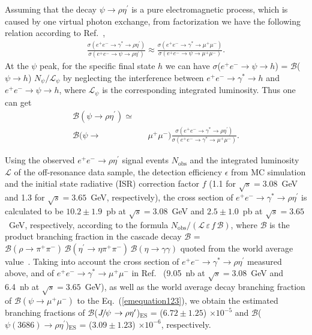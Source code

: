 \documentclass[twocolumn,showpacs,aps,prd]{revtex4-1}
\newcommand{\etap}{\eta^{\prime}}
\newcommand{\psip}{\psi(3686)}
\begin{document}
Assuming that the decay $\psi\to \rho\eta^\prime$ is a pure electromagnetic process, which is caused by one virtual photon
exchange, from factorization we have the following relation according to Ref.~\cite{daijp12},
%
\begin{eqnarray}
  \label{emequation}
  \frac{\sigma(e^+e^-\to \gamma^*\to \rho\eta^\prime)}{\sigma(e^+e^-\to \psi\to \rho\eta^\prime)}\approx
  \frac{\sigma(e^+e^-\to \gamma^*\to \mu^+\mu^-)}{\sigma(e^+e^-\to \psi\to \mu^+\mu^-)}.
\end{eqnarray}
%
    At the $\psi$ peak, for the specific final state $h$ we can have $\sigma$($e^{+}e^{-} \to \psi \to h$) = $\mathcal{B}$($\psi\to h$) $N_{\psi} /\mathcal{L_{\psi}}$ by neglecting the interference between $e^{+}e^{-} \to \gamma^{*} \to h$ and $e^{+}e^{-} \to \psi \to h$,
where $\mathcal{L}_{\psi}$ is the corresponding integrated luminosity.  Thus one can get
\begin{eqnarray}
  \label{emequation123}
   \mathcal{B}(\psi\to \rho\eta^\prime) \simeq && \nonumber \\
     \mathcal{B}(\psi\to &&\mu^+\mu^-)  \frac{\sigma(e^+e^-\to \gamma^*\to \rho\eta^\prime)}{\sigma(e^+e^-\to \gamma^*\to \mu^+\mu^-)} .
\end{eqnarray}


Using the observed $e^{+}e^{-}\to \rho \etap$ signal events $N_\text{obs}$ and the integrated luminosity $\mathcal{L}$ of the off-resonance data sample, the detection efficiency $\epsilon$ from MC simulation and the initial state radiative (ISR) correction factor $f$ (1.1 for $\sqrt{s} = 3.08$~GeV and 1.3 for $\sqrt{s} = 3.65$~GeV, respectively), the cross section of $e^{+}e^{-}\to \gamma^{*} \to \rho \etap$ is calculated to be $10.2\pm 1.9$~pb at $\sqrt{s}= 3.08$~GeV and $2.5\pm 1.0$~pb at $\sqrt{s} = 3.65$~GeV, respectively, according to the formula $N_\text{obs}/(\mathcal{L}\, \varepsilon\,  f\, \mathcal{B})$, where $\mathcal{B}$ is the product branching fraction in the cascade decay $\mathcal{B}$ = $\mathcal{B}(\rho\to \pi^+\pi^-)\, \mathcal{B}(\eta^\prime\to \eta\pi^+\pi^-)\, \mathcal{B}(\eta\to \gamma\gamma)$ quoted from the world average value~\cite{pdg}. Taking into account the cross section of $e^{+}e^{-}\to \gamma^{*} \to \rho \etap$ measured above, and of $e^{+}e^{-}\to \gamma^{*} \to \mu^{+}\mu^{-}$ in Ref.~\cite{crosssectioneetomumu} (9.05~nb at $\sqrt s = 3.08$~GeV and 6.4~nb at $\sqrt s = 3.65$~GeV), as well as the world average decay branching fraction of $\mathcal{B}(\psi\to\mu^{+}\mu^{-})$ to the Eq.~(\ref{emequation123}), we obtain the estimated branching fractions of $\mathcal{B}$($\jpsi\to\rho\etap$)$_{\mathrm{ES}}$ = ($6.72\pm1.25$) $\times 10^{-5}$ and $\mathcal{B}$($\psip\to\rho\etap$)$_{\mathrm{ES}}$ = ($3.09\pm1.23$) $\times 10^{-6}$, respectively.
\end{document}
